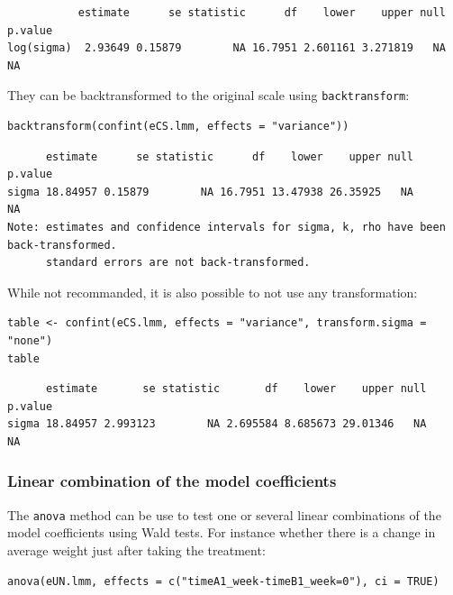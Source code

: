 \documentclass[12pt]{article}
\begin{document}
\begin{verbatim}
           estimate      se statistic      df    lower    upper null p.value
log(sigma)  2.93649 0.15879        NA 16.7951 2.601161 3.271819   NA      NA
\end{verbatim}


They can be backtransformed to the original scale using \texttt{backtransform}:

\lstset{language=r,label= ,caption= ,captionpos=b,numbers=none}
\begin{lstlisting}
backtransform(confint(eCS.lmm, effects = "variance"))
\end{lstlisting}

\begin{verbatim}
      estimate      se statistic      df    lower    upper null p.value
sigma 18.84957 0.15879        NA 16.7951 13.47938 26.35925   NA      NA
Note: estimates and confidence intervals for sigma, k, rho have been back-transformed. 
      standard errors are not back-transformed.
\end{verbatim}


While not recommanded, it is also possible to not use any transformation:
\lstset{language=r,label= ,caption= ,captionpos=b,numbers=none}
\begin{lstlisting}
table <- confint(eCS.lmm, effects = "variance", transform.sigma = "none")
table
\end{lstlisting}

\begin{verbatim}
      estimate       se statistic       df    lower    upper null p.value
sigma 18.84957 2.993123        NA 2.695584 8.685673 29.01346   NA      NA
\end{verbatim}

\subsubsection{Linear combination of the model coefficients}
\label{sec:org9c10cb7}

The \texttt{anova} method can be use to test one or several linear
combinations of the model coefficients using Wald tests. For instance
whether there is a change in average weight just after taking the
treatment:
\lstset{language=r,label= ,caption= ,captionpos=b,numbers=none}
\begin{lstlisting}
anova(eUN.lmm, effects = c("timeA1_week-timeB1_week=0"), ci = TRUE)
\end{lstlisting}
\end{document}
